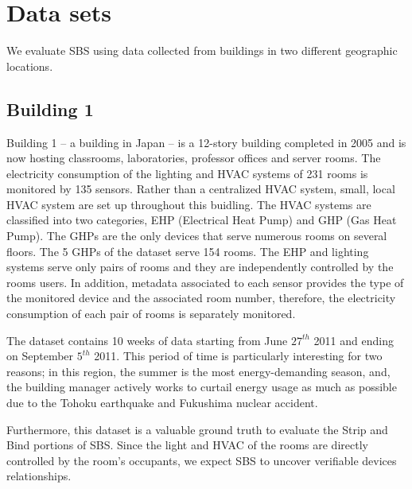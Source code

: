 \section{Data sets}
We evaluate SBS using data collected from buildings in two different geographic locations.  

\subsection{Building 1} \label{data:engbldg2}
Building 1 -- a building in Japan -- is a 12-story building completed in 2005 and is now hosting classrooms, laboratories, professor offices 
and server rooms.  
The electricity consumption of the lighting and HVAC systems of 231 rooms is monitored by 135 sensors.
Rather than a centralized HVAC system, small, local HVAC system are set up throughout this buidling.  
The HVAC systems are classified into two categories, EHP (Electrical Heat Pump) and GHP (Gas Heat Pump).
The GHPs are the only devices that serve numerous rooms on several floors.  The 5 GHPs of the dataset serve 154 rooms.
The EHP and lighting systems serve only pairs of rooms and they are independently controlled by the rooms users.
In addition, metadata associated to each sensor provides the type of the monitored device and the associated room number, 
therefore, the electricity consumption of each pair of rooms is separately monitored.

The dataset contains 10 weeks of data starting from June $27^{th}$ 2011 and ending on September $5^{th}$ 2011.
This period of time is particularly interesting for two reasons; in this region, the summer is the most energy-demanding 
season, and, the building manager actively works to curtail energy usage as much as possible due to the Tohoku earthquake and Fukushima nuclear accident.

Furthermore, this dataset is a valuable ground truth to evaluate the Strip and Bind portions of SBS.
Since the light and HVAC of the rooms are directly controlled by the room's occupants, we expect SBS to uncover verifiable devices 
relationships.  

